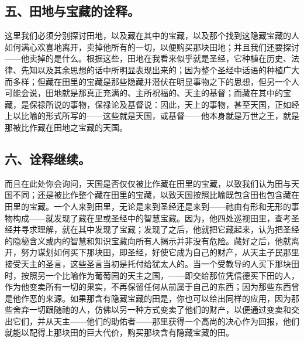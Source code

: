 
\subsection{五、田地与宝藏的诠释。}

这里我们必须分别探讨田地，以及藏在其中的宝藏，以及那个找到这隐藏宝藏的人如何满心欢喜地离开，卖掉他所有的一切，以便购买那块田地；并且我们还要探讨——他卖掉的是什么。根据这些，田地在我看来似乎就是圣经，它种植在历史、法律、先知以及其余思想的话中所明显表现出来的；因为整个圣经中话语的种植广大而多样；但藏在田里的宝藏是那些隐藏并潜伏在明显事物之下的思想，但另一个人可能会说，田地就是那真正充满的、主所祝福的、天主的基督；而藏在其中的宝藏，是保禄所说的事物，保禄论及基督说：因此，天上的事物，甚至天国，正如经上以比喻的形式所写的——这些就是天国，或基督——他本身就是万世之王，就是那被比作藏在田地之宝藏的天国。\par


\subsection{六、诠释继续。}

而且在此处你会询问，天国是否仅仅被比作藏在田里的宝藏，以致我们认为田与天国不同；还是被比作整个藏在田里的宝藏，以致天国按照比喻既包含田也包含藏在田里的宝藏。一个人来到田里，无论是来到圣经还是来到——祂由有形和无形的事物构成——就发现了藏在里或圣经中的智慧宝藏。因为，他四处巡视田里，查考圣经并寻求理解，就在其中发现了宝藏；发现了之后，他就把它藏起来，认为把圣经的隐秘含义或内的智慧和知识宝藏向所有人揭示并非没有危险。藏好之后，他就离开，努力谋划如何买下那块田，即圣经，好使它成为自己的财产，从天主子民那里接受天主的圣言，这些圣言当初是托付给犹太人的。当一个受教导的人买下那块田时，按照另一个比喻作为葡萄园的天主之国，——即交给那位凭信德买下田的人，作为他变卖所有一切的果实，不再保留任何从前属于自己的东西；因为那些东西曾是他作恶的来源。如果那含有隐藏宝藏的田是，你也可以给出同样的应用，因为那些舍弃一切跟随祂的人，仿佛以另一种方式变卖了他们的财产，以便通过变卖和交出它们，并从天主——他们的助佑者——那里获得一个高尚的决心作为回报，他们就能以配得上那块田的巨大代价，购买那块含有隐藏宝藏的田。\par

